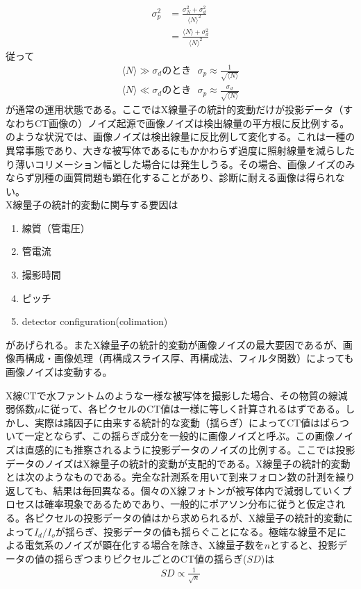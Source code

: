 \begin{align}
\sigma^2_p&=\frac{\sigma^2_N+\sigma^2_d}{\langle N \rangle^2}\\
&=\frac{\langle N \rangle + \sigma^2_d}{\langle N \rangle^2}
\end{align}
従って
\begin{align}
\langle N \rangle\gg\sigma_dのとき\ \ \ \sigma_p\approx\frac{1}{\sqrt{\langle N \rangle}}\label{eq:normal}\\
\langle N \rangle\ll\sigma_dのとき\ \ \ \sigma_p\approx\frac{\sigma_d}{\sqrt{\langle N \rangle}}\label{eq:ijou}
\end{align}
が通常の運用状態である。ここではX線量子の統計的変動だけが投影データ（すなわちCT画像の）ノイズ起源で画像ノイズは検出線量の平方根に反比例する。\\
のような状況では、画像ノイズは検出線量に反比例して変化する。これは一種の異常事態であり、大きな被写体であるにもかかわらず過度に照射線量を減らしたり薄いコリメーション幅とした場合には発生しうる。その場合、画像ノイズのみならず別種の画質問題も顕在化することがあり、診断に耐える画像は得られない。\\
X線量子の統計的変動に関与する要因は
\begin{enumerate}
\item 線質（管電圧）
\item 管電流
\item 撮影時間
\item ピッチ
\item detector configuration(colimation)
\end{enumerate}
があげられる。またX線量子の統計的変動が画像ノイズの最大要因であるが、画像再構成・画像処理（再構成スライス厚、再構成法、フィルタ関数）によっても画像ノイズは変動する。

X線CTで水ファントムのような一様な被写体を撮影した場合、その物質の線減弱係数$\mu$に従って、各ピクセルのCT値は一様に等しく計算されるはずである。しかし、実際は諸因子に由来する統計的な変動（揺らぎ）によってCT値はばらついて一定とならず、この揺らぎ成分を一般的に画像ノイズと呼ぶ。この画像ノイズは直感的にも推察されるように投影データのノイズの比例する。ここでは投影データのノイズはX線量子の統計的変動が支配的である。X線量子の統計的変動とは次のようなものである。完全な計測系を用いて到来フォロン数の計測を繰り返しても、結果は毎回異なる。個々のX線フォトンが被写体内で減弱していくプロセスは確率現象であるためであり、一般的にポアソン分布に従うと仮定される。各ピクセルの投影データの値はから求められるが、X線量子の統計的変動によって$I_d/I_o$が揺らぎ、投影データの値も揺らぐことになる。極端な線量不足による電気系のノイズが顕在化する場合を除き、X線量子数を$n$とすると、投影データの値の揺らぎつまりピクセルごとのCT値の揺らぎ($SD$)は
\begin{align}
SD\propto\frac{1}{\sqrt{n}}
\end{align}

